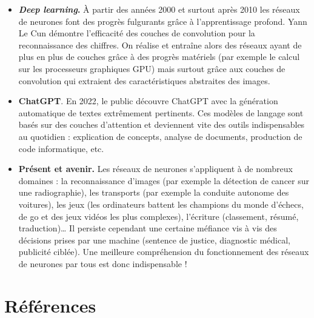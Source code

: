 \documentclass[11pt,class=report,crop=false]{standalone}
\begin{document}
\begin{itemize}
  \item \textbf{\emph{Deep learning}.} À partir des années 2000 et surtout après 2010 les réseaux de neurones font des progrès fulgurants grâce à l'apprentissage profond. Yann Le Cun démontre l'efficacité des couches de convolution pour la reconnaissance des chiffres. On réalise et entraîne alors des réseaux ayant de plus en plus de couches grâce à des progrès matériels (par exemple le calcul sur les processeurs graphiques GPU) mais surtout grâce aux couches de convolution qui extraient des caractéristiques abstraites des images.  
  
  \item \textbf{ChatGPT}. En 2022, le public découvre ChatGPT avec la génération automatique de textes extrêmement pertinents. Ces modèles de langage sont basés sur des couches d'attention et deviennent vite des outils indispensables au quotidien : explication de concepts, analyse de documents, production de code informatique, etc.
  
  \item \textbf{Présent et avenir.} Les réseaux de neurones s'appliquent à de nombreux domaines : la reconnaissance d'images (par exemple la détection de cancer sur une radiographie), les transports (par exemple la conduite autonome des voitures), les jeux (les ordinateurs battent les champions du monde d'échecs, de go et des jeux vidéos les plus complexes), l'écriture (classement, résumé, traduction)\ldots{} 
  Il persiste cependant une certaine méfiance vis à vis des décisions prises par une machine (sentence de justice, diagnostic médical, publicité ciblée). Une meilleure compréhension du fonctionnement des réseaux de neurones par tous est donc indispensable !
\end{itemize}


\section{Références}
\end{document}
